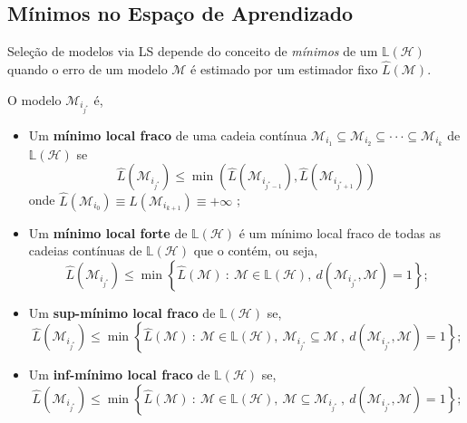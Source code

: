 \subsection{Mínimos no Espaço de Aprendizado}

Seleção de modelos via LS depende do conceito de \textit{mínimos} de um $\mathbb{L} \left( \mathcal{H} \right)$ quando o erro de um modelo $\mathcal{M}$ é estimado por um estimador fixo $\hat{L} \left( \mathcal{M} \right)$.

\begin{definition}
    O modelo $\mathcal{M}_{i_{j^{*}}}$ é,
    \begin{itemize}
        \item Um \textbf{mínimo local fraco} de uma cadeia contínua  $\mathcal{M}_{i_{1}} \subseteq \mathcal{M}_{i_{2}} \subseteq \cdot \cdot \cdot \subseteq \mathcal{M}_{i_{k}} $ de $\mathbb{L} \left( \mathcal{H} \right)$ se
        $$\hat{L} \left( \mathcal{M}_{i_{j^{*}}} \right) \leq \min \left( \hat{L} \left( \mathcal{M}_{i_{j^{*}-1}} \right), \hat{L} \left( \mathcal{M}_{i_{j^{*}+1}} \right)  \right)$$
        onde $\hat{L} \left( \mathcal{M}_{i_{0}} \right) \equiv \hat{L} \left( \mathcal{M}_{i_{k+1}} \right) \equiv + \infty  $ ;

        \item Um \textbf{mínimo local forte} de $\mathbb{L} \left( \mathcal{H} \right)$ é um mínimo local fraco de todas as cadeias contínuas de $\mathbb{L} \left( \mathcal{H} \right)$ que o contém, ou seja,
        $$\hat{L} \left( \mathcal{M}_{i_{j^{*}}} \right) \leq \min \left\{ \hat{L} \left( \mathcal{M} \right) \ : \ \mathcal{M} \in \mathbb{L} \left( \mathcal{H} \right), \ d \left( \mathcal{M}_{i_{j^{*}}}, \mathcal{M} \right) = 1 \right\} \text{;}$$

        \item Um \textbf{sup-mínimo local fraco} de $\mathbb{L} \left( \mathcal{H} \right)$ se,
        $$\hat{L} \left( \mathcal{M}_{i_{j^{*}}} \right) \leq \min \left\{ \hat{L} \left( \mathcal{M} \right) \ : \ \mathcal{M} \in \mathbb{L} \left( \mathcal{H} \right), \ \mathcal{M}_{i_{j^{*}}} \subseteq \mathcal{M} \ ,\ d \left( \mathcal{M}_{i_{j^{*}}}, \mathcal{M} \right) = 1 \right\} \text{;}$$

        \item Um \textbf{inf-mínimo local fraco} de $\mathbb{L} \left( \mathcal{H} \right)$ se,
        $$\hat{L} \left( \mathcal{M}_{i_{j^{*}}} \right) \leq \min \left\{ \hat{L} \left( \mathcal{M} \right) \ : \ \mathcal{M} \in \mathbb{L} \left( \mathcal{H} \right), \ \mathcal{M} \subseteq \mathcal{M}_{i_{j^{*}}} \ ,\ d \left( \mathcal{M}_{i_{j^{*}}}, \mathcal{M} \right) = 1 \right\} \text{;}$$


\end{itemize}
\end{definition}
